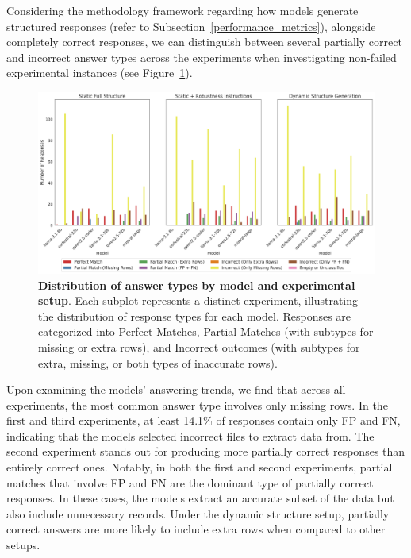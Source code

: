 \documentclass{DESSThesis}
\begin{document}
\noindent Considering the methodology framework regarding how models generate structured responses (refer to Subsection~\ref{performance_metrics}), alongside completely correct responses, we can distinguish between several partially correct and incorrect answer types across the experiments when investigating non-failed experimental instances (see Figure~\ref{fig:answer_type_classification}). 

\begin{figure}[ht]
    \centering
    \includegraphics[width=\linewidth]{img/Results/First Experimental Phase/Answer Type Classification per Model Across Experiments.png}
    \caption[Distribution of answer types by model and experimental setup]{\textbf{Distribution of answer types by model and experimental setup}. Each subplot represents a distinct experiment, illustrating the distribution of response types for each model. Responses are categorized into Perfect Matches, Partial Matches (with subtypes for missing or extra rows), and Incorrect outcomes (with subtypes for extra, missing, or both types of inaccurate rows).}
    \label{fig:answer_type_classification}
\end{figure}

Upon examining the models' answering trends, we find that across all experiments, the most common answer type involves only missing rows. In the first and third experiments, at least 14.1\% of responses contain only FP and FN, indicating that the models selected incorrect files to extract data from. The second experiment stands out for producing more partially correct responses than entirely correct ones. Notably, in both the first and second experiments, partial matches that involve FP and FN are the dominant type of partially correct responses. In these cases, the models extract an accurate subset of the data but also include unnecessary records. Under the dynamic structure setup, partially correct answers are more likely to include extra rows when compared to other setups.
\end{document}
